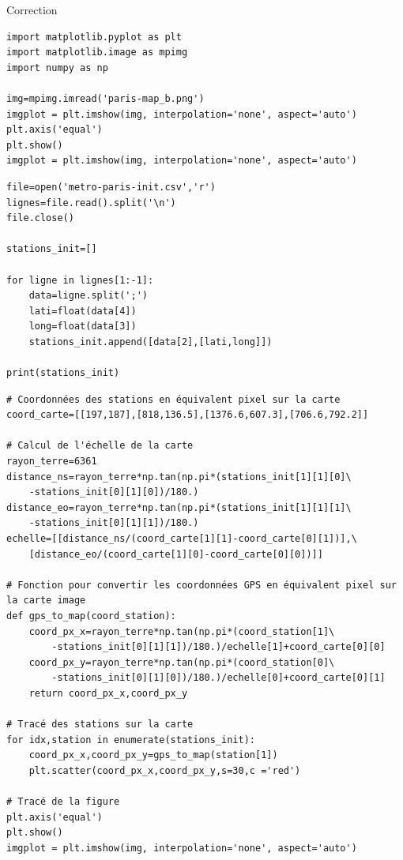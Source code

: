 \begin{center}
\Large{Correction}
\end{center}

\reponse{}

\begin{verbatim}
import matplotlib.pyplot as plt
import matplotlib.image as mpimg
import numpy as np

img=mpimg.imread('paris-map_b.png')
imgplot = plt.imshow(img, interpolation='none', aspect='auto')
plt.axis('equal')
plt.show()
imgplot = plt.imshow(img, interpolation='none', aspect='auto')
\end{verbatim}

\reponse{}

\begin{verbatim}
file=open('metro-paris-init.csv','r')
lignes=file.read().split('\n')
file.close()

stations_init=[]

for ligne in lignes[1:-1]:
    data=ligne.split(';')
    lati=float(data[4])
    long=float(data[3])
    stations_init.append([data[2],[lati,long]])

print(stations_init)
\end{verbatim}

\reponse{}

\begin{verbatim}
# Coordonnées des stations en équivalent pixel sur la carte
coord_carte=[[197,187],[818,136.5],[1376.6,607.3],[706.6,792.2]]

# Calcul de l'échelle de la carte
rayon_terre=6361
distance_ns=rayon_terre*np.tan(np.pi*(stations_init[1][1][0]\
	-stations_init[0][1][0])/180.)
distance_eo=rayon_terre*np.tan(np.pi*(stations_init[1][1][1]\
	-stations_init[0][1][1])/180.)
echelle=[[distance_ns/(coord_carte[1][1]-coord_carte[0][1])],\
	[distance_eo/(coord_carte[1][0]-coord_carte[0][0])]]

# Fonction pour convertir les coordonnées GPS en équivalent pixel sur la carte image
def gps_to_map(coord_station):
    coord_px_x=rayon_terre*np.tan(np.pi*(coord_station[1]\
    	-stations_init[0][1][1])/180.)/echelle[1]+coord_carte[0][0]
    coord_px_y=rayon_terre*np.tan(np.pi*(coord_station[0]\
    	-stations_init[0][1][0])/180.)/echelle[0]+coord_carte[0][1]
    return coord_px_x,coord_px_y

# Tracé des stations sur la carte
for idx,station in enumerate(stations_init):
    coord_px_x,coord_px_y=gps_to_map(station[1])
    plt.scatter(coord_px_x,coord_px_y,s=30,c ='red')

# Tracé de la figure
plt.axis('equal')
plt.show()
imgplot = plt.imshow(img, interpolation='none', aspect='auto')
\end{verbatim}

